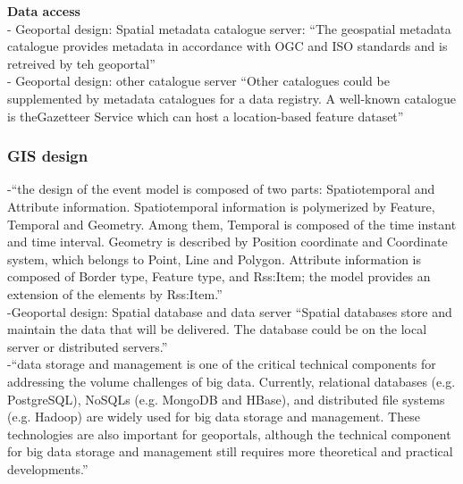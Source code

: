 \textbf{Data access}\\
-{\color{orange} Geoportal design: Spatial metadata catalogue server: ``The geospatial metadata catalogue provides metadata in accordance with OGC and ISO standards and is retreived by teh geoportal'' \cite{Jiang2020}}\\
-{\color{orange} Geoportal design: other catalogue server ``Other catalogues could be supplemented by metadata catalogues for a data registry. A well-known catalogue is theGazetteer Service which can host a location-based feature dataset'' \cite{Jiang2020}}\\

\subsubsection{GIS design}
-{\color{orange}“the design of the event model is composed of two parts: Spatiotemporal and Attribute information. Spatiotemporal information is polymerized by Feature, Temporal and Geometry. Among them, Temporal is composed of the time instant and time interval. Geometry is described by Position coordinate and Coordinate system, which belongs to Point, Line and Polygon. Attribute information is composed of Border type, Feature type, and Rss:Item; the model provides an extension of the elements by Rss:Item.”}\cite{Xing2015}\\
-{\color{orange}Geoportal design: Spatial database and data server ``Spatial databases store and maintain the data that will be delivered. The database could be on the local server or distributed servers.''\cite{Jiang2020}}\\
-{\color{orange}“data storage and management is one of the critical technical components for addressing the volume challenges of big data. Currently, relational databases (e.g. PostgreSQL), NoSQLs (e.g. MongoDB and HBase), and distributed file systems (e.g. Hadoop) are widely used for big data storage and management. These technologies are also important for geoportals, although the technical component for big data storage and management still requires more theoretical and practical developments.” \cite{Jiang2020}}\\

